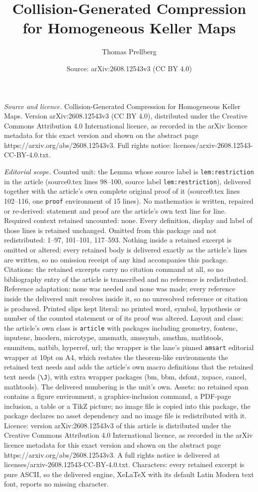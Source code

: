 \documentclass[10pt,a4paper]{amsart}
\title[Collision-Generated Compression for Homogeneous Keller Maps]{Collision-Generated Compression for Homogeneous Keller Maps}
\author{Thomas Prellberg}
\date{Source: arXiv:2608.12543v3 (CC BY 4.0)}
\begin{document}
\maketitle

\noindent\emph{Source and licence.} Collision-Generated Compression for Homogeneous Keller Maps. Version arXiv:2608.12543v3 (CC BY 4.0), distributed under the Creative Commons Attribution 4.0 International licence, as recorded in the arXiv licence metadata for this exact version and shown on the abstract page https://arxiv.org/abs/2608.12543v3. Full rights notice: licenses/arxiv-2608.12543-CC-BY-4.0.txt.\par\smallskip

\noindent\textit{Editorial scope.} Counted unit: the Lemma whose source label is \texttt{lem:restriction} in the article (source0.tex lines 98--100, source label \texttt{lem:restriction}), delivered together with the article's own complete original proof of it (source0.tex lines 102--116, one \texttt{proof} environment of 15 lines). No mathematics is written, repaired or re-derived: statement and proof are the article's own text line for line. Required context retained uncounted: none. Every definition, display and label of those lines is retained unchanged. Omitted from this package and not redistributed: 1--97, 101--101, 117--593. Nothing inside a retained excerpt is omitted or altered: every retained body is delivered exactly as the article's lines are written, so no omission receipt of any kind accompanies this package. Citations: the retained excerpts carry no citation command at all, so no bibliography entry of the article is transcribed and no reference is redistributed. Reference adaptation: none was needed and none was made; every reference inside the delivered unit resolves inside it, so no unresolved reference or citation is produced. Printed slips kept literal: no printed word, symbol, hypothesis or number of the counted statement or of its proof was altered. Layout and class: the article's own class is \texttt{article} with packages including geometry, fontenc, inputenc, lmodern, microtype, amsmath, amssymb, amsthm, mathtools, enumitem, natbib, hyperref, url; the wrapper is the lane's pinned \texttt{amsart} editorial wrapper at 10pt on A4, which restates the theorem-like environments the retained text needs and adds the article's own macro definitions that the retained text needs (\texttt{\textbackslash J}), with extra wrapper packages (bm, bbm, dsfont, xspace, cancel, mathtools). The delivered numbering is the unit's own. Assets: no retained span contains a figure environment, a graphics-inclusion command, a PDF-page inclusion, a table or a TikZ picture; no image file is copied into this package, the package declares no asset dependency and no image file is redistributed with it. Licence: version arXiv:2608.12543v3 of this article is distributed under the Creative Commons Attribution 4.0 International licence, as recorded in the arXiv licence metadata for this exact version and shown on the abstract page https://arxiv.org/abs/2608.12543v3. A full rights notice is delivered at licenses/arxiv-2608.12543-CC-BY-4.0.txt. Characters: every retained excerpt is pure ASCII, so the delivered engine, XeLaTeX with its default Latin Modern text font, reports no missing character.
\end{document}

